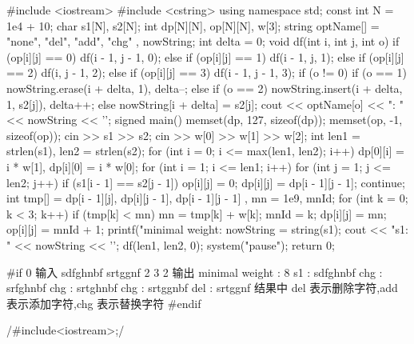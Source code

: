 \documentclass[a4paper,oneside,12pt]{ctexart}
\theoremstyle{plain}
\theoremstyle{nonumberplain}
\begin{document}
    \begin{ccode}
        #include <iostream>
        #include <cstring>
        using namespace std;
        const int N = 1e4 + 10;
        char s1[N], s2[N];
        int dp[N][N], op[N][N], w[3];
        string optName[] = { "none", "del", "add", "chg" }, nowString;
        int delta = 0;
        void df(int i, int j, int o) {
            if (op[i][j] == 0) df(i - 1, j - 1, 0);
            else if (op[i][j] == 1) df(i - 1, j, 1);
            else if (op[i][j] == 2) df(i, j - 1, 2);
            else if (op[i][j] == 3) df(i - 1, j - 1, 3);
            if (o != 0) {
                if (o == 1) nowString.erase(i + delta, 1), delta--;
                else if (o == 2) nowString.insert(i + delta, 1, s2[j]), delta++;
                else nowString[i + delta] = s2[j];
                cout << optName[o] << ": " << nowString << '\n';
            }
        }
        signed main() {
            memset(dp, 127, sizeof(dp));
            memset(op, -1, sizeof(op));
            cin >> s1 >> s2;
            cin >> w[0] >> w[1] >> w[2];
            int len1 = strlen(s1), len2 = strlen(s2);
            for (int i = 0; i <= max(len1, len2); i++) dp[0][i] = i * w[1], dp[i][0] = i * w[0];
            for (int i = 1; i <= len1; i++) {
                for (int j = 1; j <= len2; j++) {
                    if (s1[i - 1] == s2[j - 1]) {
                        op[i][j] = 0;
                        dp[i][j] = dp[i - 1][j - 1];
                        continue;
                    }
                    int tmp[] = { dp[i - 1][j], dp[i][j - 1], dp[i - 1][j - 1] }, mn = 1e9, mnId;
                    for (int k = 0; k < 3; k++) {
                        if (tmp[k] < mn) {
                            mn = tmp[k] + w[k];
                            mnId = k;
                        }
                    }
                    dp[i][j] = mn;
                    op[i][j] = mnId + 1;
                }
            }
            printf("minimal weight: %
            nowString = string(s1);
            cout << "s1:  " << nowString << '\n';
            df(len1, len2, 0);
            system("pause");
            return 0;
        }
        
        #if 0
        输入
        sdfghnbf
        srtggnf
        2 3 2
        输出
        minimal weight : 8
        s1 : sdfghnbf
        chg : srfghnbf
        chg : srtghnbf
        chg : srtggnbf
        del : srtggnf
        结果中 del 表示删除字符,add 表示添加字符,chg 表示替换字符
        #endif
    \end{ccode}

    \cinline/#include<iostream>;/
\end{document}
